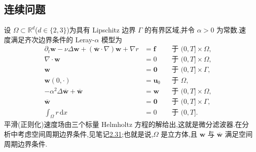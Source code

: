 \subsection{连续问题}
\label{subsec:leray-alpha-continuous-problem}

\begin{note}
\label{note:leray-alpha-continuous-model}
设 $\Omega\subset\mathbb{R}^d$($d\in\{2,3\}$)为具有 Lipschitz 边界 $\Gamma$ 的有界区域,并令 $\alpha>0$ 为常数.速度满足齐次边界条件的 Leray-$\alpha$ 模型为
\begin{equation}\label{eq:leray-alpha-model}
\begin{aligned}
 \partial_t\bm{w}-\nu\Delta\bm{w}
  +(\overline{\bm{w}}\cdot\nabla)\bm{w}+\nabla r
  &=\bm{f} &&\text{于 }(0,T]\times\Omega,\\
 \nabla\cdot\bm{w}&=0 &&\text{于 }(0,T]\times\Omega,\\
 \bm{w}&=\bm{0} &&\text{于 }(0,T]\times\Gamma,\\
 \bm{w}(0,\cdot)&=\bm{u}_0 &&\text{于 }\Omega,\\
 -\alpha^2\Delta\overline{\bm{w}}+\overline{\bm{w}}
  &=\bm{w} &&\text{于 }(0,T]\times\Omega,\\
 \overline{\bm{w}}&=\bm{0} &&\text{于 }(0,T]\times\Gamma,\\
 \int_\Omega r\,\mathrm{d}x&=0 &&\text{于 }(0,T].
\end{aligned}
\end{equation}
平滑(正则化)速度场由三个标量 Helmholtz 方程的解给出,这就是微分滤波器.在分析中考虑空间周期边界条件,见笔记\hyperref[note:infinite-periodic-boundary]{2.31};也就是说,$\Omega$ 是立方体,且 $\bm{w}$ 与 $\overline{\bm{w}}$ 满足空间周期边界条件.
\end{note}

